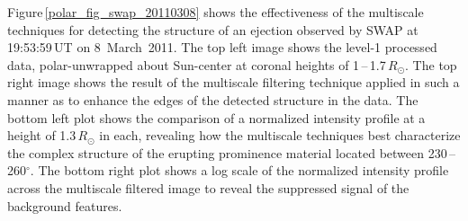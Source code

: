\documentclass[namedreferences]{solarphysics}
\begin{document}
\begin{article}
Figure\,\ref{polar_fig_swap_20110308} shows the effectiveness of the multiscale techniques for detecting the structure of an ejection observed by SWAP at 19:53:59\,UT on 8~March~2011. The top left image shows the level-1 processed data, polar-unwrapped about Sun-center at coronal heights of 1\,--\,1.7\,$R_{\odot}$. The top right image shows the result of the multiscale filtering technique applied in such a manner as to enhance the edges of the detected structure in the data. The bottom left plot shows the comparison of a normalized intensity profile at a height of 1.3\,$R_{\odot}$ in each, revealing how the multiscale techniques best characterize the complex structure of the erupting prominence material located between  230\,--\,260$^\circ$. The bottom right plot shows a log scale of the normalized intensity profile across the multiscale filtered image to reveal the suppressed signal of the background features.
\begin{figure}[p]

\end{figure}
\end{article}
\end{document}
